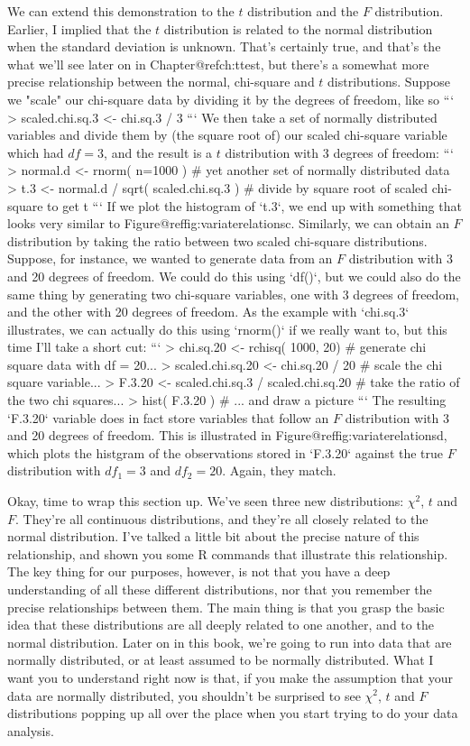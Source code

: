 We can extend this demonstration to the $t$ distribution and the $F$ distribution. Earlier, I implied that the $t$ distribution is related to the normal distribution when the standard deviation is unknown. That's certainly true, and that's the what we'll see later on in  Chapter@refch:ttest, but there's a somewhat more precise relationship between the normal, chi-square and $t$ distributions. Suppose we "scale" our chi-square data by dividing it by the degrees of freedom, like so
```
> scaled.chi.sq.3 <- chi.sq.3 / 3
```
We then take a set of normally distributed variables and divide them by (the square root of) our scaled chi-square variable which had $df=3$, and the result is a $t$ distribution with 3 degrees of freedom:
```
> normal.d <- rnorm( n=1000 )  # yet another set of normally distributed data
> t.3 <- normal.d / sqrt( scaled.chi.sq.3 )  # divide by square root of scaled chi-square to get t
```
If we plot the histogram of `t.3`, we end up with something that looks very similar to Figure@reffig:variaterelationsc. Similarly, we can obtain an $F$ distribution by taking the ratio between two scaled chi-square distributions. Suppose, for instance, we wanted to generate data from an $F$ distribution with 3 and 20 degrees of freedom. We could do this using `df()`, but we could also do the same thing by generating two chi-square variables, one with 3 degrees of freedom, and the other with 20 degrees of freedom. As the example with `chi.sq.3` illustrates, we can actually do this using `rnorm()` if we really want to, but this time I'll take a short cut:
```
> chi.sq.20 <- rchisq( 1000, 20)  # generate chi square data with df = 20...
> scaled.chi.sq.20 <- chi.sq.20 / 20  # scale the chi square variable...
> F.3.20 <-  scaled.chi.sq.3  / scaled.chi.sq.20 # take the ratio of the two chi squares...
> hist( F.3.20 ) # ... and draw a picture
```
The resulting `F.3.20` variable does in fact store variables that follow an $F$ distribution with 3 and 20 degrees of freedom. This is illustrated in Figure@reffig:variaterelationsd, which plots the histgram of the observations stored in `F.3.20` against the true $F$ distribution with $df_1 = 3$ and $df_2 = 20$. Again, they match. 

Okay, time to wrap this section up. We've seen three new distributions: $\chi^2$, $t$ and $F$. They're all continuous distributions, and they're all closely related to the normal distribution. I've talked a little bit about the precise nature of this relationship, and shown you some R commands that illustrate this relationship. The key thing for our purposes, however, is not that you have a deep understanding of all these different distributions, nor that you remember the precise relationships between them. The main thing is that you grasp the basic idea that these distributions are all deeply related to one another, and to the normal distribution. Later on in this book, we're going to run into data that are normally distributed, or at least assumed to be normally distributed. What I want you to understand right now is that, if you make the assumption that your data are normally distributed, you shouldn't be surprised to see $\chi^2$, $t$ and $F$ distributions popping up all over the place when you start trying to do your data analysis. 




